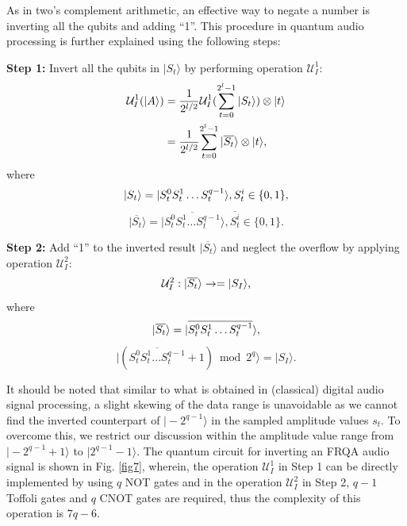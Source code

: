 \documentclass[10pt,journal,compsoc]{IEEEtran}
\begin{document}
As in two's complement arithmetic, an effective way to negate a number is inverting all the qubits and adding ``1''. This procedure in quantum audio processing is further explained using the following steps:

\textbf{Step 1:} Invert all the qubits in $\vert S_t\rangle$ by performing operation $\mathcal{U}_{I}^1$:
\begin{equation}\label{eq24}
\begin{aligned}
\mathcal{U}_{I}^1(\vert A\rangle) & = {1\over 2^{l/2}}{\mathcal{U}_{I}^1(\sum_{t=0}^{2^{l} - 1}{\vert S_t\rangle})\otimes \vert t\rangle} \\
& = {1\over 2^{l/2}}{\sum_{t=0}^{2^{l} - 1}{\vert \overline{S_t}\rangle}\otimes \vert t\rangle}, \notag
\end{aligned}
\end{equation}
where
\begin{equation}
\vert S_t \rangle = \vert S_t^0S_t^1\ldots S_t^{q-1} \rangle, S_t^i \in\{0, 1\}, \notag
\end{equation}
\begin{equation}
\vert \overline{S_t} \rangle = \vert \overline{S_t^0 S_t^1 \ldots S_t^{q-1}} \rangle, \overline{S_t^i} \in\{0, 1\}.
\end{equation}

\textbf{Step 2:} Add ``1'' to the inverted result $\vert \overline{S_t}\rangle$ and neglect the overflow by applying operation $\mathcal{U}_{I}^2$:
\begin{equation}\label{eq25}
\mathcal{U}_{I}^2 : \vert \overline{S_t} \rangle \rightarrow = \vert S_I \rangle, \notag
\end{equation}
where
\begin{equation}
\vert \overline{S_t} \rangle = \vert \overline{S_t^0 S_t^1 \ldots S_t^{q-1}} \rangle, \notag
\end{equation}
\begin{equation}
\vert (\overline{S_t^0 S_t^1 \ldots S_t^{q-1}} + 1) \bmod 2^{q} \rangle = \vert S_I \rangle.
\end{equation}

It should be noted that similar to what is obtained in (classical) digital audio signal processing, a slight skewing of the data range is unavoidable as we cannot find the inverted counterpart of $\vert -2^{q-1}\rangle$ in the sampled amplitude values $s_t$. To overcome this, we restrict our discussion within the amplitude value range from $\vert -2^{q-1} + 1\rangle$ to $\vert 2^{q-1} - 1\rangle$. The quantum circuit for inverting an FRQA audio signal is shown in Fig. \ref{fig7}, wherein, the operation $\mathcal{U}_{I}^1$ in Step 1 can be directly implemented by using $q$ NOT gates and in the operation $\mathcal{U}_{I}^2$ in Step 2, $q - 1$ Toffoli gates and $q$ CNOT gates are required, thus the complexity of this operation is $7q - 6$.
\end{document}
